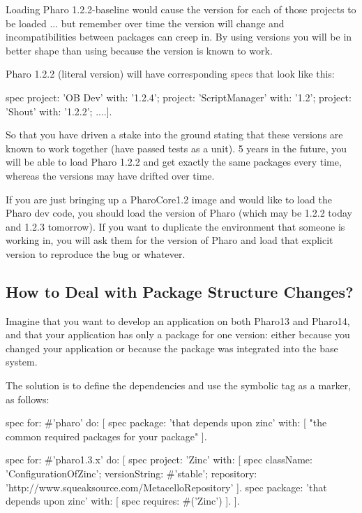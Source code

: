 \documentclass[a4paper,10pt,twoside]{book}
\begin{document}
Loading Pharo 1.2.2-baseline would cause the  version for each of those projects to be loaded ...
but remember over time the  version will change and incompatibilities between packages can creep in.
By using  versions you will be in better shape than using  because the  version is known to work.

Pharo 1.2.2 (literal version) will have corresponding specs that look like this:

\begin{code}{}
 spec
    project: 'OB Dev' with: '1.2.4';
    project: 'ScriptManager' with: '1.2';
    project: 'Shout' with: '1.2.2';
    ....].
\end{code}

So that you have driven a stake into the ground stating that these versions are known to work together (have passed tests as a unit). 5 years in the future, you will be able to load Pharo 1.2.2 and get exactly the same packages every time, whereas the  versions may have drifted over time.

If you are just bringing up a PharoCore1.2 image and would like to load the Pharo dev code, you should load the  version of Pharo (which may be 1.2.2 today and 1.2.3 tomorrow).
If you want to duplicate the environment that someone is working in, you will ask them for the version of Pharo and load that explicit version to reproduce the bug or whatever.


\subsection{How to Deal with Package Structure Changes?}
Imagine that you want to develop an application on both Pharo13 and Pharo14, and that your application has only a package for one version: either because
you changed your application or because the package was integrated into the base system.

The solution is to define the dependencies and use the symbolic tag as a marker, as follows:

\begin{code}{}
spec for: #'pharo' do: [
   spec package: 'that depends upon zinc' with: [
     "the common required packages for your package"
   ].

spec for: #'pharo1.3.x' do: [
   spec project: 'Zinc' with: [
       spec
           className: 'ConfigurationOfZinc';
           versionString: #'stable';
           repository: 'http://www.squeaksource.com/MetacelloRepository' ].
   spec package: 'that depends upon zinc' with: [
       spec requires: #('Zinc') ].
].
\end{code}
\end{document}
